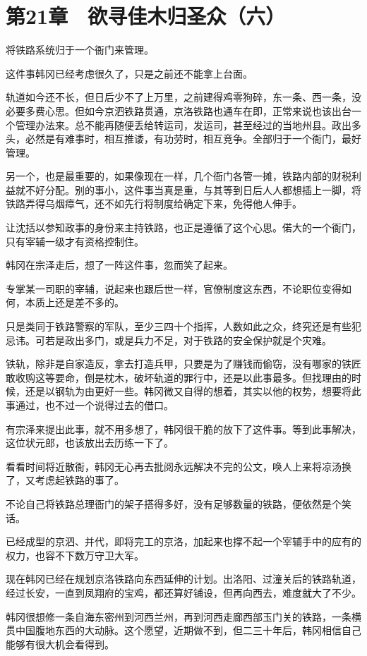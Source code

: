 \section{第21章　欲寻佳木归圣众（六）}

将铁路系统归于一个衙门来管理。

这件事韩冈已经考虑很久了，只是之前还不能拿上台面。

轨道如今还不长，但日后少不了上万里，之前建得鸡零狗碎，东一条、西一条，没必要多费心思。但如今京泗铁路贯通，京洛铁路也通车在即，正常来说也该出台一个管理办法来。总不能再随便丢给转运司，发运司，甚至经过的当地州县。政出多头，必然是有难事时，相互推诿，有功劳时，相互竞争。全部归于一个衙门，最好管理。

另一个，也是最重要的，如果像现在一样，几个衙门各管一摊，铁路内部的财税利益就不好分配。别的事小，这件事当真是重，与其等到日后人人都想插上一脚，将铁路弄得乌烟瘴气，还不如先行将制度给确定下来，免得他人伸手。

让沈括以参知政事的身份来主持铁路，也正是遵循了这个心思。偌大的一个衙门，只有宰辅一级才有资格控制住。

韩冈在宗泽走后，想了一阵这件事，忽而笑了起来。

专掌某一司职的宰辅，说起来也跟后世一样，官僚制度这东西，不论职位变得如何，本质上还是差不多的。

只是类同于铁路警察的军队，至少三四十个指挥，人数如此之众，终究还是有些犯忌讳。可若是政出多门，或是兵力不足，对于铁路的安全保护就是个灾难。

铁轨，除非是自家造反，拿去打造兵甲，只要是为了赚钱而偷窃，没有哪家的铁匠敢收购这等要命，倒是枕木，破坏轨道的罪行中，还是以此事最多。但找理由的时候，还是以钢轨为由更好一些。韩冈微又自得的想着，其实以他的权势，想要将此事通过，也不过一个说得过去的借口。

有宗泽来提出此事，就不用多想了，韩冈很干脆的放下了这件事。等到此事解决，这位状元郎，也该放出去历练一下了。

看看时间将近散衙，韩冈无心再去批阅永远解决不完的公文，唤人上来将凉汤换了，又考虑起铁路的事了。

不论自己将铁路总理衙门的架子搭得多好，没有足够数量的铁路，便依然是个笑话。

已经成型的京泗、并代，即将完工的京洛，加起来也撑不起一个宰辅手中的应有的权力，也容不下数万守卫大军。

现在韩冈已经在规划京洛铁路向东西延伸的计划。出洛阳、过潼关后的铁路轨道，经过长安，一直到凤翔府的宝鸡，都还算好铺设，但再向西去，难度就大了不少。

韩冈很想修一条自海东密州到河西兰州，再到河西走廊西部玉门关的铁路，一条横贯中国腹地东西的大动脉。这个愿望，近期做不到，但二三十年后，韩冈相信自己能够有很大机会看得到。

